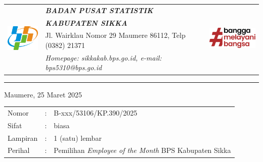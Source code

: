 \documentclass{article}
\begin{document}


\begin{tabular}{llr}
   \multirow{4}{*}{\includegraphics[width=2cm]{logo/bps-logo.png}} %
   &
   \large{\textbf{\textit{BADAN PUSAT STATISTIK}}}
   & \multirow{4}{*}{\includegraphics[width=3cm]{logo/rb/bmb-color.png}} \\
   & \large{\textbf{\textit{KABUPATEN SIKKA}}} & \\
   & Jl. Wairklau Nomor 29 Maumere 86112, Telp (0382) 21371 & \\
   & \textit{Homepage: sikkakab.bps.go.id, e-mail: bps5310@bps.go.id} & \\
\end{tabular}

\hfill

\vspace{-1em} %

\rule{\linewidth}{1pt} %


\hfill
Maumere, 25 Maret 2025

\begin{tabular}{@{} lcl}
	Nomor&:&B-xxx/53106/KP.390/2025 \\
	Sifat&:&biasa \\
	Lampiran&:&1 (satu) lembar\\
    Perihal&:& Pemilihan \textit{Employee of the Month} BPS Kabupaten Sikka\\
\end{tabular}

\bigskip %

\end{document}
